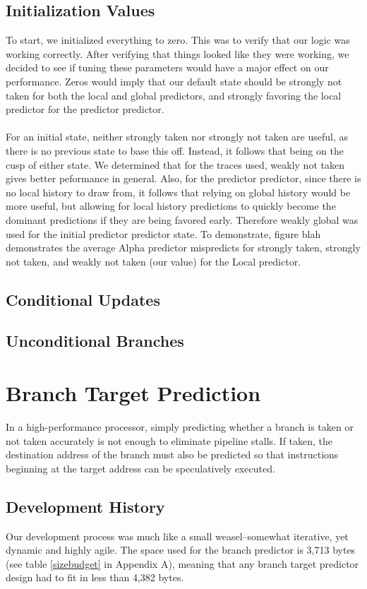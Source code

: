 \documentclass[twocolumn]{article}
\begin{document}
\subsection{Initialization Values}
To start, we initialized everything to zero. This was to verify that our logic was working correctly. After verifying that things looked like they were working, we decided to see if tuning these parameters would have a major effect on our performance. Zeros would imply that our default state should be strongly not taken for both the local and global predictors, and strongly favoring the local predictor for the predictor predictor.\\\\
For an initial state, neither strongly taken nor strongly not taken are useful, as there is no previous state to base this off. Instead, it follows that being on the cusp of either state. We determined that for the traces used, weakly not taken gives better peformance in general. Also, for the predictor predictor, since there is no local history to draw from, it follows that relying on global history would be more useful, but allowing for local history predictions to quickly become the dominant predictions if they are being favored early. Therefore weakly global was used for the initial predictor predictor state. 
To demonstrate, figure blah demonstrates the average Alpha predictor mispredicts for strongly taken, strongly not taken, and weakly not taken (our value) for the Local predictor. 
\subsection{Conditional Updates}
\subsection{Unconditional Branches}

\section{Branch Target Prediction}
In a high-performance processor, simply predicting whether a branch is taken or not taken accurately is not enough to eliminate pipeline stalls.  If taken, the destination address of the branch must also be predicted so that instructions beginning at the target address can be speculatively executed. 
 
\subsection{Development History}
Our development process was much like a small weasel--somewhat iterative, yet dynamic and highly agile.  The space used for the branch predictor is 3,713 bytes (see table \ref{sizebudget} in Appendix A), meaning that any branch target predictor design had to fit in less than 4,382 bytes.
\end{document}

